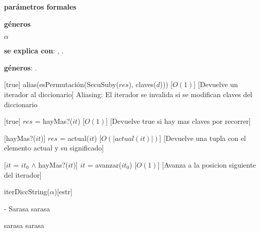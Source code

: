 
\begin{Interfaz}

  \textbf{par\'ametros formales}\parindent\\
  \parbox{1.7cm}{\textbf{g\'eneros}} $\alpha$
 
 
  \textbf{se explica con}: , .

  \textbf{g\'eneros}: .


%
[true]
{alias(esPermutaci\'on(SecuSuby($res$), claves($d$)))}%
[$O(1)$] %
[Devuelve un iterador al diccionario]
{Aliasing: El iterador se invalida si se modifican claves del diccionario}

%
[true]
{$res$ = hayMas?($it$)}%
[$O(1)$]
[Devuelve true si hay mas claves por recorrer]

%
[hayMas?($it$)]
{$res$ = actual($it$)}%
[$O(|actual(it)|)$]
[Devuelve una tupla con el elemento actual y su significado]

%
[$it$ = $it_0$ $\land$ hayMas?($it$)]
{$it$ = avanzar($it_0$)}%
[$O(1)$]
[Avanza a la posicion siguiente del iterador]



\end{Interfaz}

\pagebreak

\begin{Representacion}
  
  
  \begin{Estructura}{iterDiccString($\alpha$)}[estr]
    \begin{Tupla}[estr]
    \end{Tupla}
  \end{Estructura}



- Sarasa sarasa

%
{
    sarasa sarasa
}%

\end{Representacion}

